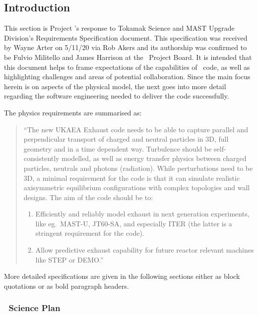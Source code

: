 \subsection{Introduction}
\label{sec:introduction}

This section is Project \nep's response to Tokamak Science and MAST Upgrade Division's
Requirements Specification document.
This specification was received by Wayne Arter  on 5/11/20 via Rob Akers
and its authorship was confirmed to be Fulvio Militello and James Harrison at the \nep \  Project Board.
It is intended that this document helps to frame expectations of the
capabilities of \nep\ code,
as well as highlighting challenges and areas of potential collaboration.
Since  the main focus herein is on aspects of the physical model, the
next  goes into more detail regarding the software engineering
needed to deliver the code successfully.

The physics requirements are summarised as:
\begin{quote}
``The new UKAEA Exhaust code needs to be able to capture parallel and
perpendicular transport of charged and neutral particles in 3D, full geometry
and in a time dependent way. Turbulence should be self-consistently modelled,
as well as energy transfer physics between charged particles, neutrals and
photons (radiation). While perturbations need to be 3D, a minimal requirement
for the code is that it can simulate realistic axisymmetric equilibrium
configurations with complex topologies and wall designs.
The aim of the code should be to:
\begin{enumerate}
	\item Efficiently and reliably model exhaust in next generation
		experiments, like eg.\  MAST-U, JT60-SA, and especially ITER
		(the latter is a stringent requirement for the code).
	\item Allow predictive exhaust capability for future reactor relevant
		machines like STEP or DEMO.''
\end{enumerate}
\end{quote}
More detailed specifications are given in the following sections
either as block quotations or as bold paragraph headers.

\subsubsection{\nep\ Science Plan}

